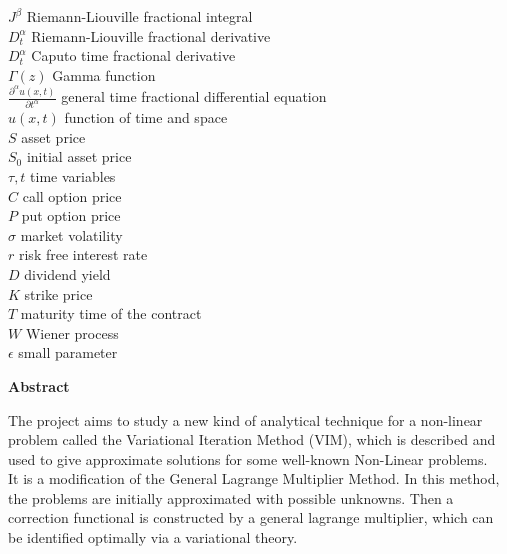 \documentclass[12pt, a4paper]{report}
\begin{document}
\begin{tabbing}
    $J^\beta$ \> Riemann-Liouville fractional integral \\
    $D^\alpha_t$ \> Riemann-Liouville fractional derivative \\
    $D^\alpha_t$ \> Caputo time fractional derivative \\
    $\Gamma(z)$ \> Gamma function \\
    $\frac{\partial^\alpha u(x,t)}{\partial t^\alpha}$ \> general time fractional differential equation \\
    $u(x, t)$ \> function of time and space \\
    $S$ \> asset price \\
    $S_0$ \> initial asset price \\
    $\tau, t$ \> time variables \\
    $C$ \> call option price \\
    $P$ \> put option price \\
    $\sigma$ \> market volatility \\
    $r$ \> risk free interest rate \\
    $D$ \> dividend yield \\
    $K$ \> strike price \\
    $T$ \> maturity time of the contract \\
    $W$ \> Wiener process \\
    $\epsilon$ \> small parameter \\
\end{tabbing}




\clearpage
\begin{center}
\textbf{\Large Abstract}
\end{center}
The project aims to study a new kind of analytical technique for a non-linear problem called the Variational Iteration Method (VIM), which is described and used to give approximate solutions for some well-known Non-Linear problems.\\

It is a modification of the General Lagrange Multiplier Method. In this method, the problems are initially approximated with possible unknowns. Then a correction functional is constructed by a general lagrange multiplier, which can be identified optimally via a variational theory.\\
\end{document}
